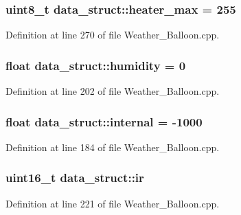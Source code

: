 \subsubsection[{\texorpdfstring{heater\+\_\+max}{heater\_max}}]{\setlength{\rightskip}{0pt plus 5cm}uint8\+\_\+t data\+\_\+struct\+::heater\+\_\+max = 255}\hypertarget{structdata__struct_a4b4c5b81a3132706b1a85c0cd46164a0}{}\label{structdata__struct_a4b4c5b81a3132706b1a85c0cd46164a0}


Definition at line 270 of file Weather\+\_\+\+Balloon.\+cpp.

\subsubsection[{\texorpdfstring{humidity}{humidity}}]{\setlength{\rightskip}{0pt plus 5cm}float data\+\_\+struct\+::humidity = 0}\hypertarget{structdata__struct_a629b9280db11d568e378b0cb9330bee7}{}\label{structdata__struct_a629b9280db11d568e378b0cb9330bee7}


Definition at line 202 of file Weather\+\_\+\+Balloon.\+cpp.

\subsubsection[{\texorpdfstring{internal}{internal}}]{\setlength{\rightskip}{0pt plus 5cm}float data\+\_\+struct\+::internal = -\/1000}\hypertarget{structdata__struct_a63db4d4b848a51e42c86e998e7d75e58}{}\label{structdata__struct_a63db4d4b848a51e42c86e998e7d75e58}


Definition at line 184 of file Weather\+\_\+\+Balloon.\+cpp.

\subsubsection[{\texorpdfstring{ir}{ir}}]{\setlength{\rightskip}{0pt plus 5cm}uint16\+\_\+t data\+\_\+struct\+::ir}\hypertarget{structdata__struct_aa15055b51a5113db435edf1103c4c41a}{}\label{structdata__struct_aa15055b51a5113db435edf1103c4c41a}


Definition at line 221 of file Weather\+\_\+\+Balloon.\+cpp.


